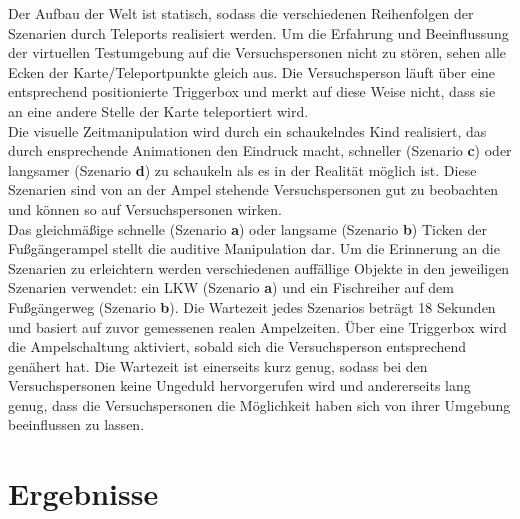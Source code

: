\documentclass{Paper}
\begin{document}
Der Aufbau der Welt ist statisch, sodass die verschiedenen Reihenfolgen der Szenarien durch Teleports realisiert werden. Um die Erfahrung und Beeinflussung der virtuellen Testumgebung auf die Versuchspersonen nicht zu stören, sehen alle Ecken der Karte/Teleportpunkte gleich aus. Die Versuchsperson läuft über eine entsprechend positionierte Triggerbox und merkt auf diese Weise nicht, dass sie an eine andere Stelle der Karte teleportiert wird.\\
Die visuelle Zeitmanipulation wird durch ein schaukelndes Kind realisiert, das durch ensprechende Animationen den Eindruck macht, schneller (Szenario \textbf{c}) oder langsamer (Szenario \textbf{d}) zu schaukeln als es in der Realität möglich ist. Diese Szenarien sind von an der Ampel stehende Versuchspersonen gut zu beobachten und können so auf Versuchspersonen wirken.\\
Das gleichmäßige schnelle (Szenario \textbf{a}) oder langsame (Szenario \textbf{b}) Ticken der Fußgängerampel stellt die auditive Manipulation dar. Um die Erinnerung an die Szenarien zu erleichtern werden verschiedenen auffällige Objekte in den jeweiligen Szenarien verwendet: ein LKW (Szenario \textbf{a}) und ein Fischreiher auf dem Fußgängerweg (Szenario \textbf{b}).
Die Wartezeit jedes Szenarios beträgt 18 Sekunden und basiert auf zuvor gemessenen realen Ampelzeiten. Über eine Triggerbox wird die Ampelschaltung aktiviert, sobald sich die Versuchsperson entsprechend genähert hat. Die Wartezeit ist einerseits kurz genug, sodass bei den Versuchspersonen keine Ungeduld hervorgerufen wird und andererseits lang genug, dass die Versuchspersonen die Möglichkeit haben sich von ihrer Umgebung beeinflussen zu lassen. 


 \section{Ergebnisse}
\end{document}
